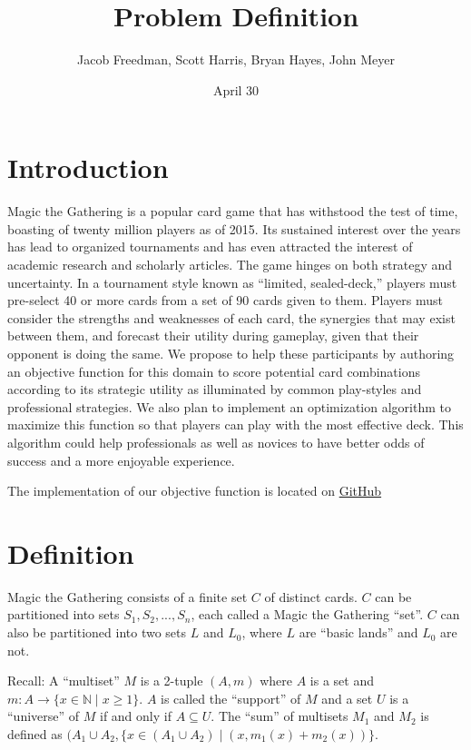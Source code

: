 \documentclass[12pt, letterpaper]{article}
\title{Problem Definition}
\date{April 30}
\author{Jacob Freedman, Scott Harris, Bryan Hayes, John Meyer}
\begin{document}
\maketitle

\section{Introduction}

Magic the Gathering is a popular card game that has withstood the test of time,
boasting of twenty million players as of 2015.
Its sustained interest over the years has lead to organized tournaments
and has even attracted the interest of academic research and scholarly articles.
The game hinges on both strategy and uncertainty.
In a tournament style known as \enquote{limited, sealed-deck,}
players must pre-select 40 or more cards from a set of 90 cards given to them.
Players must consider the strengths and weaknesses of each card,
the synergies that may exist between them,
and forecast their utility during gameplay,
given that their opponent is doing the same.
We propose to help these participants by authoring an objective function for this
domain to score potential card combinations according to its strategic utility
as illuminated by common play-styles and professional strategies.
We also plan to implement an optimization algorithm to maximize this function
so that players can play with the most effective deck.
This algorithm could help professionals as well as novices to have better odds of success
and a more enjoyable experience.

The implementation of our objective function is located on
\href{https://github.com/0x326/miami-university-cse-464-group-project}{GitHub}

\section{Definition}

Magic the Gathering consists of a finite set $ C $ of distinct cards.
$ C $ can be partitioned into sets $ S_1, S_2, ..., S_n $, each called a Magic the Gathering \enquote{set}.
$ C $ can also be partitioned into two sets $ L $ and $ L_0 $, where $ L $ are \enquote{basic lands} and $ L_0 $ are not.

Recall: A \enquote{multiset} $ M $ is a 2-tuple $ (A, m) $
where $ A $ is a set and $ m: A \rightarrow \{x \in \mathbb{N} \mid x \ge 1 \} $.
$ A $ is called the \enquote{support} of $ M $ and
a set $ U $ is a \enquote{universe} of $ M $ if and only if $ A \subseteq U $.
The \enquote{sum} of multisets $ M_1 $ and $ M_2 $ is defined as
$ (A_1 \cup A_2, \{ x \in (A_1 \cup A_2) \mid (x, m_1(x) + m_2(x)) \} $.
\end{document}
